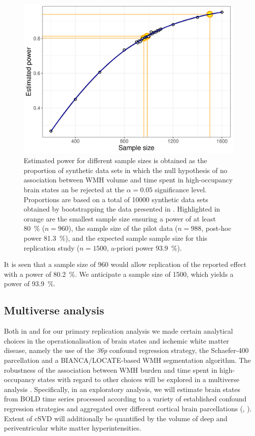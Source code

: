 \begin{figure}
    \includegraphics[width=.5\linewidth]{./../analysis/code/R/pipeline_files/figure-html/power-1.png}
    \caption{Estimated power for different sample sizes is obtained as the proportion of synthetic data sets in which the null hypothesis of no association between WMH volume and time spent in high-occupancy brain states an be rejected at the $\alpha=0.05$ significance level. Proportions are based on a total of \num{10000} synthetic data sets obtained by bootstrapping the data presented in \citep{Schlemm2022-he}. Highlighted in orange are the smallest sample size ensuring a power of at least \qty{80}{\percent} ($n=960$), the sample size of the pilot data ($n=988$, post-hoc power \qty{81.3}{\percent}), and the expected sample sample size for this replication study ($n=1500$, a-priori power \qty{93.9}{\percent}).}
    \label{fig:power}
\end{figure}

It is seen that a sample size of \num{960} would allow replication of the reported effect with a power of \qty{80.2}{\percent}.
We anticipate a sample size of \num{1500}, which yields a power of \qty{93.9}{\percent}.


\subsection{Multiverse analysis}
Both in \citep{Schlemm2022-he} and for our primary replication analysis we made certain analytical choices in the operationalisation of brain states and ischemic white matter disease, namely the use of the \textit{36p} confound regression strategy, the Schaefer-\num{400} parcellation and a BIANCA/LOCATE-based WMH segmentation algorithm.
The robustness of the association between WMH burden and time spent in high-occupancy states with regard to other choices will be explored in a multiverse analysis \citep{Steegen2016-ze}. Specifically, in an exploratory analysis, we will estimate brain states from BOLD time series processed according to a variety of established confound regression strategies and aggregated over different cortical brain parcellations (, \cite{ciric2018mitigating,Ciric2017-cl}). Extent of cSVD will additionally be quantified by the volume of deep and periventricular white matter hyperintensities.

